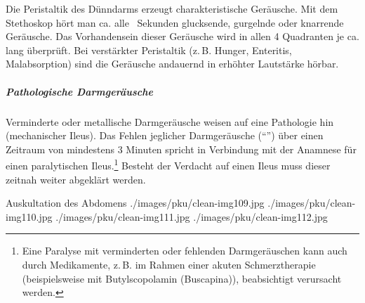 {Die Peristaltik des Dünndarms erzeugt charakteristische Geräusche.
Mit dem Stethoskop hört man ca. alle ~Sekunden
glucksende, gurgelnde oder knarrende Geräusche. Das Vorhandensein dieser
Geräusche wird in allen 4 Quadranten je ca. 
lang überprüft. Bei verstärkter Peristaltik (z.\,B. Hunger, Enteritis,
Malabsorption) sind die Geräusche andauernd in erhöhter
Lautstärke hörbar.


\subparagraph{Pathologische Darmgeräusche} Verminderte oder
metallische Darmgeräusche weisen auf eine Pathologie hin (mechanischer Ileus). 
Das Fehlen jeglicher
Darmgeräusche (\enquote{}) über einen Zeitraum von
mindestens 3 Minuten spricht in Verbindung mit der
Anamnese für einen paralytischen Ileus.\footnote{Eine Paralyse mit verminderten oder
fehlenden Darmgeräuschen kann auch durch Medikamente,
z.\,B. im Rahmen einer akuten Schmerztherapie
(beispielsweise mit Butylscopolamin
(Buscapina{\texttrademark})), beabsichtigt verursacht
werden.} Besteht der Verdacht auf einen Ileus muss
dieser zeitnah weiter abgeklärt werden.

}
{\begin{PkuBefunde}[]
  \item[\SymbolPkuNormal] 
  \item[\SymbolPkuVariante] 
  
  \item[\SymbolFindingPathological] 
  
\end{PkuBefunde}}
{}
{}
{}


\begin{PictureSeries}{}{Auskultation des Abdomens}
{./images/pku/clean-img109.jpg}
{}
{./images/pku/clean-img110.jpg}
{}
{}
{}
{}
{}
{./images/pku/clean-img111.jpg}
{}
{./images/pku/clean-img112.jpg}
{}
{}
{}
{}
{}
\end{PictureSeries}



